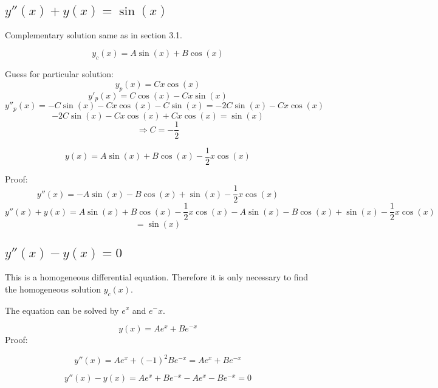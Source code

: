 \documentclass[11pt]{article}
\begin{document}
\subsection{$ y''(x) + y(x) = \sin(x) $}

Complementary solution same as in section 3.1.

\[ y_c(x) = A\sin(x) + B\cos(x) \]

Guess for particular solution:
\[ y_p(x) = C x \cos(x)\]
\[ y'_p(x) = C \cos(x) - C x \sin(x) \]
\[ y''_p(x) = - C \sin(x) - C x \cos(x) - C \sin(x) = -2 C \sin(x) - C x \cos(x) \]
\[ -2 C \sin(x) - C x \cos(x) + C x \cos(x) = \sin(x) \]
\[ \Rightarrow C = -\frac{1}{2} \]

\[\boxed{ y(x) = A\sin(x) + B\cos(x) -\frac{1}{2}x\cos(x) }\]

Proof:
\[ y''(x) = - A\sin(x) - B\cos(x) + \sin(x) - \frac{1}{2} x \cos(x) \]
\[ y''(x) + y(x) = A\sin(x) + B\cos(x) -\frac{1}{2}x\cos(x) - A\sin(x) - B\cos(x) + \sin(x) - \frac{1}{2} x \cos(x) \]
\[ = \sin(x) \]

\subsection{$ y''(x) - y(x) = 0 $}

This is a homogeneous differential equation. Therefore it is only necessary to find the homogeneous solution $y_c(x)$.

The equation can be solved by $e^x$ and $e^-x$. 

\[\boxed{ y(x) = Ae^x + Be^{-x} }\]  
Proof:

\[ y''(x) = Ae^x + (-1)^2Be^{-x} = Ae^x + Be^{-x}\]

\[ y''(x) - y(x) = Ae^x + Be^{-x} - Ae^x - Be^{-x} = 0\]
\end{document}
